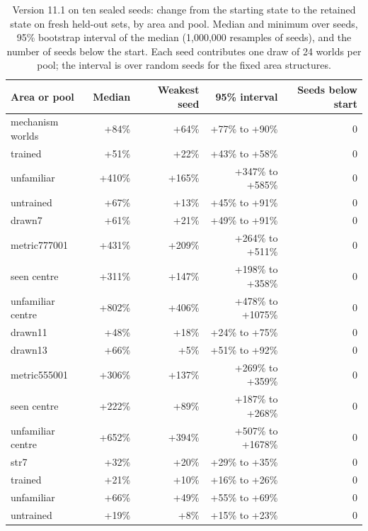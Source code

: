 \begin{table}[t]
\centering
\caption{Version 11.1 on ten sealed seeds: change from the starting state to the retained state on fresh held-out sets, by area and pool. Median and minimum over seeds, 95\% bootstrap interval of the median (1,000,000 resamples of seeds), and the number of seeds below the start. Each seed contributes one draw of 24 worlds per pool; the interval is over random seeds for the fixed area structures.}
\label{tab:tenpools}
\small
\begin{tabular}{lrrrr}
\toprule
Area or pool & Median & Weakest seed & 95\% interval & Seeds below start \\
\midrule
mechanism worlds & +84\% & +64\% & +77\% to +90\% & 0 \\
\quad trained & +51\% & +22\% & +43\% to +58\% & 0 \\
\quad unfamiliar & +410\% & +165\% & +347\% to +585\% & 0 \\
\quad untrained & +67\% & +13\% & +45\% to +91\% & 0 \\
drawn7 & +61\% & +21\% & +49\% to +91\% & 0 \\
metric777001 & +431\% & +209\% & +264\% to +511\% & 0 \\
\quad seen centre & +311\% & +147\% & +198\% to +358\% & 0 \\
\quad unfamiliar centre & +802\% & +406\% & +478\% to +1075\% & 0 \\
drawn11 & +48\% & +18\% & +24\% to +75\% & 0 \\
drawn13 & +66\% & +5\% & +51\% to +92\% & 0 \\
metric555001 & +306\% & +137\% & +269\% to +359\% & 0 \\
\quad seen centre & +222\% & +89\% & +187\% to +268\% & 0 \\
\quad unfamiliar centre & +652\% & +394\% & +507\% to +1678\% & 0 \\
str7 & +32\% & +20\% & +29\% to +35\% & 0 \\
\quad trained & +21\% & +10\% & +16\% to +26\% & 0 \\
\quad unfamiliar & +66\% & +49\% & +55\% to +69\% & 0 \\
\quad untrained & +19\% & +8\% & +15\% to +23\% & 0 \\
\bottomrule
\end{tabular}
\end{table}
